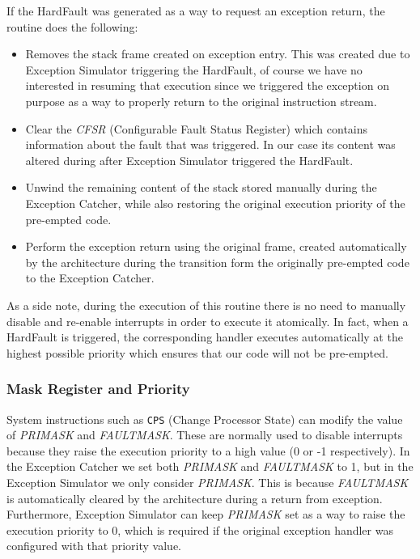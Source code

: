 \documentclass{article}
\begin{document}
If the HardFault was generated as a way to request an exception return, the routine does the following:
\begin{itemize}
	\item Removes the stack frame created on exception entry. This was created due to Exception Simulator triggering the HardFault, of course we have no interested in resuming that execution since we triggered the exception on purpose as a way to properly return to the original instruction stream.
	\item Clear the \textit{CFSR} (Configurable Fault Status Register) which contains information about the fault that was triggered. In our case its content was altered during after Exception Simulator triggered the HardFault.
	\item Unwind the remaining content of the stack stored manually during the Exception Catcher, while also restoring the original execution priority of the pre-empted code.
	\item Perform the exception return using the original frame, created automatically by the architecture during the transition form the originally pre-empted code to the Exception Catcher.
\end{itemize}

As a side note, during the execution of this routine there is no need to manually disable and re-enable interrupts in order to execute it atomically. In fact, when a HardFault is triggered, the corresponding handler executes automatically at the highest possible priority which ensures that our code will not be pre-empted.

\subsubsection{Mask Register and Priority}
System instructions such as \verb|CPS| (Change Processor State) can modify the value of \textit{PRIMASK} and \textit{FAULTMASK}. These are normally used to disable interrupts because they raise the execution priority to a high value (0 or -1 respectively). In the Exception Catcher we set both \textit{PRIMASK} and \textit{FAULTMASK} to 1, but in the Exception Simulator we only consider \textit{PRIMASK}. This is because \textit{FAULTMASK} is automatically cleared by the architecture during a return from exception. Furthermore, Exception Simulator can keep \textit{PRIMASK} set as a way to raise the execution priority to 0, which is required if the original exception handler was configured with that priority value.
\end{document}
